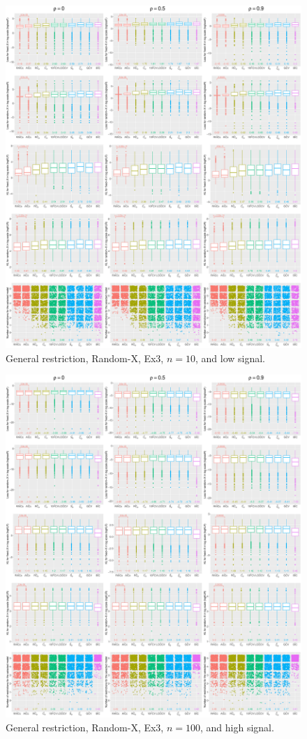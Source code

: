 \begin{figure}[!ht]
\centering
\includegraphics[width=\textwidth]{figures/supplement/randomx/general_restriction/Ex3_n10_lsnr.eps}
\caption{General restriction, Random-X, Ex3, $n=10$, and low signal.}
\end{figure}
\clearpage
\begin{figure}[!ht]
\centering
\includegraphics[width=\textwidth]{figures/supplement/randomx/general_restriction/Ex3_n100_hsnr.eps}
\caption{General restriction, Random-X, Ex3, $n=100$, and high signal.}
\end{figure}
